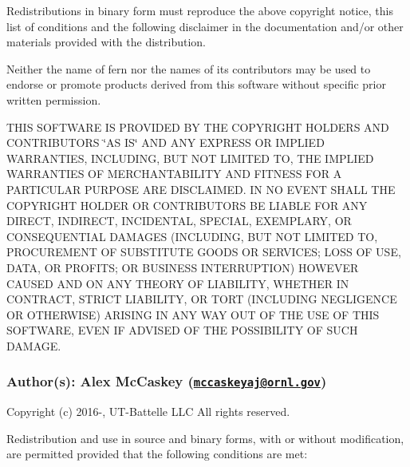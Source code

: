 Redistributions in binary form must reproduce the above copyright notice, this list of conditions and the following disclaimer in the documentation and/or other materials provided with the distribution.

Neither the name of fern nor the names of its contributors may be used to endorse or promote products derived from this software without specific prior written permission.

T\+H\+IS S\+O\+F\+T\+W\+A\+RE IS P\+R\+O\+V\+I\+D\+ED BY T\+HE C\+O\+P\+Y\+R\+I\+G\+HT H\+O\+L\+D\+E\+RS A\+ND C\+O\+N\+T\+R\+I\+B\+U\+T\+O\+RS \char`\"{}\+A\+S I\+S\char`\"{} A\+ND A\+NY E\+X\+P\+R\+E\+SS OR I\+M\+P\+L\+I\+ED W\+A\+R\+R\+A\+N\+T\+I\+ES, I\+N\+C\+L\+U\+D\+I\+NG, B\+UT N\+OT L\+I\+M\+I\+T\+ED TO, T\+HE I\+M\+P\+L\+I\+ED W\+A\+R\+R\+A\+N\+T\+I\+ES OF M\+E\+R\+C\+H\+A\+N\+T\+A\+B\+I\+L\+I\+TY A\+ND F\+I\+T\+N\+E\+SS F\+OR A P\+A\+R\+T\+I\+C\+U\+L\+AR P\+U\+R\+P\+O\+SE A\+RE D\+I\+S\+C\+L\+A\+I\+M\+ED. IN NO E\+V\+E\+NT S\+H\+A\+LL T\+HE C\+O\+P\+Y\+R\+I\+G\+HT H\+O\+L\+D\+ER OR C\+O\+N\+T\+R\+I\+B\+U\+T\+O\+RS BE L\+I\+A\+B\+LE F\+OR A\+NY D\+I\+R\+E\+CT, I\+N\+D\+I\+R\+E\+CT, I\+N\+C\+I\+D\+E\+N\+T\+AL, S\+P\+E\+C\+I\+AL, E\+X\+E\+M\+P\+L\+A\+RY, OR C\+O\+N\+S\+E\+Q\+U\+E\+N\+T\+I\+AL D\+A\+M\+A\+G\+ES (I\+N\+C\+L\+U\+D\+I\+NG, B\+UT N\+OT L\+I\+M\+I\+T\+ED TO, P\+R\+O\+C\+U\+R\+E\+M\+E\+NT OF S\+U\+B\+S\+T\+I\+T\+U\+TE G\+O\+O\+DS OR S\+E\+R\+V\+I\+C\+ES; L\+O\+SS OF U\+SE, D\+A\+TA, OR P\+R\+O\+F\+I\+TS; OR B\+U\+S\+I\+N\+E\+SS I\+N\+T\+E\+R\+R\+U\+P\+T\+I\+ON) H\+O\+W\+E\+V\+ER C\+A\+U\+S\+ED A\+ND ON A\+NY T\+H\+E\+O\+RY OF L\+I\+A\+B\+I\+L\+I\+TY, W\+H\+E\+T\+H\+ER IN C\+O\+N\+T\+R\+A\+CT, S\+T\+R\+I\+CT L\+I\+A\+B\+I\+L\+I\+TY, OR T\+O\+RT (I\+N\+C\+L\+U\+D\+I\+NG N\+E\+G\+L\+I\+G\+E\+N\+CE OR O\+T\+H\+E\+R\+W\+I\+SE) A\+R\+I\+S\+I\+NG IN A\+NY W\+AY O\+UT OF T\+HE U\+SE OF T\+H\+IS S\+O\+F\+T\+W\+A\+RE, E\+V\+EN IF A\+D\+V\+I\+S\+ED OF T\+HE P\+O\+S\+S\+I\+B\+I\+L\+I\+TY OF S\+U\+CH D\+A\+M\+A\+GE.

\subsubsection*{Author(s)\+: Alex Mc\+Caskey (\href{mailto:mccaskeyaj@ornl.gov}{\tt mccaskeyaj@ornl.\+gov}) }



 Copyright (c) 2016-\/, U\+T-\/\+Battelle L\+LC All rights reserved.

Redistribution and use in source and binary forms, with or without modification, are permitted provided that the following conditions are met\+:

